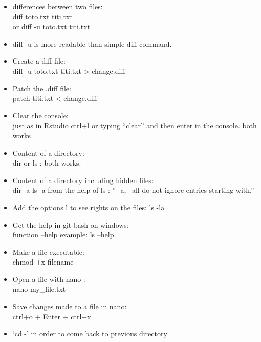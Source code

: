 \documentclass[
]{book}
\begin{document}
\begin{itemize}
\item
  differences between two files:\\
  diff toto.txt titi.txt\\
  or diff -u toto.txt titi.txt
\item
  diff -u is more readable than simple diff command.
\item
  Create a diff file:\\
  diff -u toto.txt titi.txt \textgreater{} change.diff
\item
  Patch the .diff file:\\
  patch titi.txt \textless{} change.diff
\item
  Clear the console:\\
  just as in Rstudio ctrl+l
  or typing ``clear'' and then enter in the console.
  both works
\item
  Content of a directory:\\
  dir or ls : both works.
\item
  Content of a directory including hidden files:\\
  dir -a
  ls -a
  from the help of ls : '' -a, --all do not ignore entries starting with.''
\item
  Add the options l to see rights on the files:
  ls -la
\item
  Get the help in git bash on windows:\\
  function --help
  example: ls --help
\item
  Make a file executable:\\
  chmod +x filename
\item
  Open a file with nano :\\
  nano my\_file.txt
\item
  Save changes made to a file in nano:\\
  ctrl+o + Enter + ctrl+x
\item
  `cd -' in order to come back to previous directory
\end{itemize}

  
\end{document}
